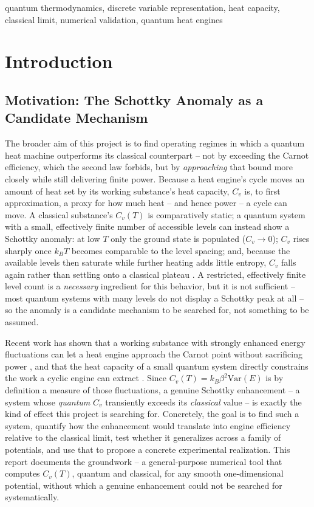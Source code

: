 \documentclass[10pt,conference]{IEEEtran}
\begin{document}
\begin{IEEEkeywords}
quantum thermodynamics, discrete variable representation, heat capacity, classical limit, numerical validation, quantum heat engines
\end{IEEEkeywords}

\section{Introduction}
\label{sec:intro}

\subsection{Motivation: The Schottky Anomaly as a Candidate Mechanism}
The broader aim of this project is to find operating regimes in which a quantum heat machine outperforms its classical counterpart -- not by exceeding the Carnot efficiency, which the second law forbids, but by \emph{approaching} that bound more closely while still delivering finite power. Because a heat engine's cycle moves an amount of heat set by its working substance's heat capacity, $C_v$ is, to first approximation, a proxy for how much heat -- and hence power -- a cycle can move. A classical substance's $C_v(T)$ is comparatively static; a quantum system with a small, effectively finite number of accessible levels can instead show a Schottky anomaly: at low $T$ only the ground state is populated ($C_v\to0$); $C_v$ rises sharply once $k_BT$ becomes comparable to the level spacing; and, because the available levels then saturate while further heating adds little entropy, $C_v$ falls again rather than settling onto a classical plateau \cite{gelbwaser2018,kozin2025}. A restricted, effectively finite level count is a \emph{necessary} ingredient for this behavior, but it is not sufficient -- most quantum systems with many levels do not display a Schottky peak at all -- so the anomaly is a candidate mechanism to be searched for, not something to be assumed.

Recent work has shown that a working substance with strongly enhanced energy fluctuations can let a heat engine approach the Carnot point without sacrificing power \cite{campisifazio2016}, and that the heat capacity of a small quantum system directly constrains the work a cyclic engine can extract \cite{ye2017}. Since $C_v(T)=k_B\beta^2\mathrm{Var}(E)$ is by definition a measure of those fluctuations, a genuine Schottky enhancement -- a system whose \emph{quantum} $C_v$ transiently exceeds its \emph{classical} value -- is exactly the kind of effect this project is searching for. Concretely, the goal is to find such a system, quantify how the enhancement would translate into engine efficiency relative to the classical limit, test whether it generalizes across a family of potentials, and use that to propose a concrete experimental realization. This report documents the groundwork -- a general-purpose numerical tool that computes $C_v(T)$, quantum and classical, for any smooth one-dimensional potential, without which a genuine enhancement could not be searched for systematically.
\end{document}
